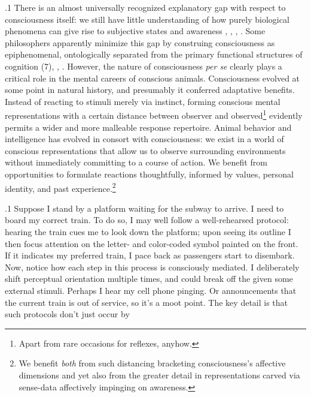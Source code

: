 \documentclass[11pt, twocolumn]{article}
\begin{document}
\p.1{%
\:\+There is an almost universally recognized explanatory gap with respect
to consciousness itself: we still have little understanding of
how purely biological phenomena can give rise to subjective
 states and awareness , ,
, . \>  Some philosophers
apparently minimize this gap by construing consciousness as epiphenomenal,
ontologically \pgl{}separated from the primary functional structures
of cognition (7), ,
. \>  However, the
nature of consciousness \textit{per se} clearly
plays a critical role in the mental careers of conscious animals. \> 
Consciousness evolved at some point in natural history, and presumably
it conferred adaptative benefits. \>  Instead of reacting to stimuli
merely via instinct, forming conscious mental representations
\mdash{} with a certain distance between observer and
observed\footnote{Apart from rare occasions for
 reflexes, anyhow.} \mdash{}
evidently permits a wider and more malleable response
repertoire. \>  Animal behavior and intelligence
has evolved in consort with consciousness: we exist in a world
of conscious representations that allow us to observe
surrounding environments without immediately committing to a
course of action. \>  We benefit
from opportunities to formulate reactions thoughtfully, informed
by values, personal identity, and past experience.\footnote{We benefit
\textit{both} from \label{fn:benefit}such
distancing \mdash{} bracketing consciousness's affective
dimensions \mdash{} and yet also from the greater detail in
representations carved via sense-data affectively
impinging on awareness.}\condenlargepage{1em}\;
}%

\p.1{%
\:\+Suppose I stand by a platform waiting for the subway to arrive. \>  I need to board
my correct train. \>  To do so, I may well follow a well-rehearsed
protocol: hearing the train cues me to look down the platform; upon seeing
its outline I then focus attention on the letter- and color-coded
symbol painted on the front. \>  If it indicates my preferred train,
I pace back as passengers start to disembark. \>  Now, notice how each step in this process is consciously mediated. \> 
I deliberately shift perceptual orientation multiple
times, and could break off the  given some external
stimuli. \>  Perhaps I hear my cell phone pinging. \>  Or announcements
that the current train is out of service, so it's a moot point. \>  The key
detail is that such protocols don't just occur by
\;
}%
\end{document}

